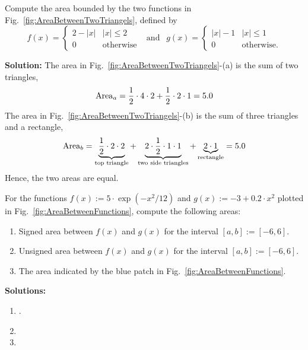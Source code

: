 \begin{example} Compute the area bounded by the two functions in Fig.~\ref{fig:AreaBetweenTwoTriangels}, defined by
\begin{equation}
\label{eq:TwoTriangles}
    f(x) = \begin{cases}
    2 - |x| & |x| \le 2 \\
    0 & \text{otherwise}
\end{cases} ~~\text{   and   } ~~g(x) = \begin{cases}
     |x| -1 & |x| \le 1 \\
    0 & \text{otherwise}.
    \end{cases}
\end{equation}    
\end{example}

\textbf{Solution:} The area in  Fig.~\ref{fig:AreaBetweenTwoTriangels}-(a) is the sum of two triangles,
$${\rm Area}_a = \frac{1}{2}\cdot 4 \cdot 2 + \frac{1}{2}\cdot 2 \cdot 1 = 5.0$$
The area in  Fig.~\ref{fig:AreaBetweenTwoTriangels}-(b) is the sum of three triangles and a rectangle,
$${\rm Area}_b = \underbrace{\frac{1}{2}\cdot 2 \cdot 2}_{\text{top triangle}} + \underbrace{2 \cdot \frac{1}{2}\cdot 1 \cdot 1}_{\text{two side triangles}} + \underbrace{2 \cdot 1}_{\text{rectangle}} = 5.0$$
Hence, the two areas are equal.

\Qed

\bigskip

\begin{example}
    For the functions $f(x) := 5 \cdot \exp(-x^2/12)$ and $g(x) := -3 + 0.2 \cdot x^2$ plotted in Fig.~\ref{fig:AreaBetweenFunctions}, compute the following areas:

    \begin{enumerate}
\renewcommand{\labelenumi}{(\alph{enumi})}
\setlength{\itemsep}{.2cm}
    \item Signed area between $f(x)$ and $g(x)$ for the interval $[a, b] := [-6, 6]$.

    \item Unsigned area between $f(x)$ and $g(x)$ for the interval $[a, b] := [-6, 6]$.

    \item The area indicated by the blue patch in Fig.~\ref{fig:AreaBetweenFunctions}.
\end{enumerate}
\end{example}

\textbf{Solutions:}

    \begin{enumerate}
\renewcommand{\labelenumi}{(\alph{enumi})}
\setlength{\itemsep}{.2cm}
    \item {}.

    \item {}

    \item {}
\end{enumerate}

